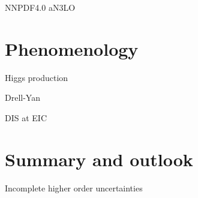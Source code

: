 \documentclass[aspectratio=169, 9pt,t]{beamer}
\begin{document}
\begin{frame}{NNPDF4.0 aN3LO}
\end{frame}

\section{Phenomenology}

\begin{frame}{Higgs production}

\end{frame}


\begin{frame}{Drell-Yan}

\end{frame}


\begin{frame}{DIS at EIC}

\end{frame}


\section{Summary and outlook}
\begin{frame}{Incomplete higher order uncertainties}
\end{frame}
\end{document}
